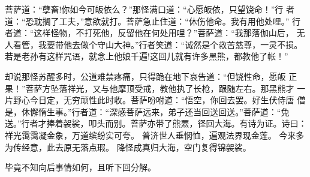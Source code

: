 菩萨道：“孽畜!你如今可皈依么？”那怪满口道：“心愿皈依，只望饶命！”行
者道：“恐耽搁了工夫，”意欲就打。菩萨急止住道：“休伤他命。我有用他处哩。”
行者道：“这样怪物，不打死他，反留他在何处用哩？”菩萨道：“我那落伽山后，
无人看管，我要带他去做个守山大神。”行者笑道：“诚然是个救苦慈尊，一灵不损。
若是老孙有这样咒语，就念上他娘千遍!这回儿就有许多黑熊，都教他了帐！”

却说那怪苏醒多时，公道难禁疼痛，只得跪在地下哀告道：“但饶性命，愿皈
正果！”菩萨方坠落祥光，又与他摩顶受戒，教他执了长枪，跟随左右。那黑熊才
一片野心今日定，无穷顽性此时收。菩萨吩咐道：“悟空，你回去罢。好生伏侍唐
僧是，休懈惰生事。”行者道：“深感菩萨远来，弟子还当回送回送。”菩萨道：“免
送。”行者才捧着袈裟，叩头而别。菩萨亦带了熊罴，径回大海。有诗为证。诗曰：
祥光霭霭凝金象，万道缤纷实可夸。
普济世人垂悯恤，遍观法界现金莲。
今来多为传经意，此去原无落点瑕。
降怪成真归大海，空门复得锦袈裟。

毕竟不知向后事情如何，且听下回分解。